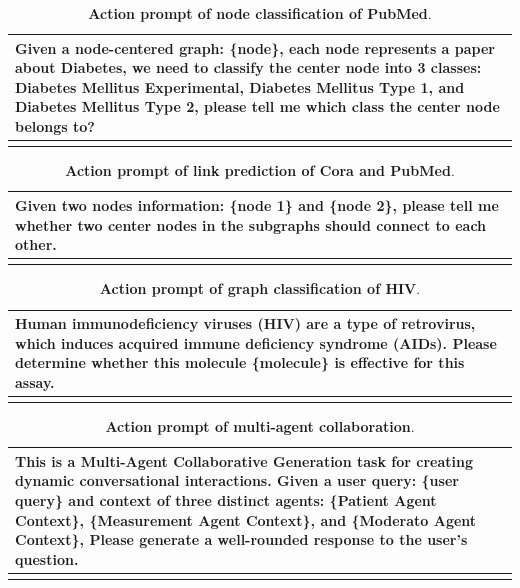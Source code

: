 \begin{table}[h]
\centering
\caption{\textbf{Action prompt of node classification of PubMed}.}
\begin{tabular}{p{13cm}}
\toprule[1.1pt]
    Given a node-centered graph: \{node\}, each node represents a paper about Diabetes, we need to classify the center node into 3 classes: Diabetes Mellitus Experimental, Diabetes Mellitus Type 1, and Diabetes Mellitus Type 2, please tell me which class the center node belongs to?\\
\bottomrule[1.1pt]
\label{prompt-template:PubMed_node}
\end{tabular}
\end{table}

\begin{table}[h]
\centering
\caption{\textbf{Action prompt of link prediction of  Cora and PubMed}.}
\begin{tabular}{p{13cm}}
\toprule[1.1pt]
    Given two nodes information: \{node 1\} and \{node 2\}, please tell me whether two center nodes in the subgraphs should connect to each other. \\
\bottomrule[1.1pt]
\label{prompt-template:link prediction}
\end{tabular}
\end{table}

\begin{table}[h]
\centering
\caption{\textbf{Action prompt of graph classification of  HIV}.}
\begin{tabular}{p{13cm}}
\toprule[1.1pt]
    Human immunodeficiency viruses (HIV) are a type of retrovirus, which induces acquired immune deficiency syndrome (AIDs). Please determine whether this molecule \{molecule\} is effective for this assay. \\
\bottomrule[1.1pt]
\label{prompt-template:HIV}
\end{tabular}
\end{table}



\begin{table}[h]
\centering
\caption{\textbf{Action prompt of multi-agent collaboration}.}
\begin{tabular}{p{13cm}}
\toprule[1.1pt]
    This is a Multi-Agent Collaborative Generation task for creating dynamic conversational interactions. Given a user query: \{user query\} and context of three distinct agents: \{Patient Agent Context\}, \{Measurement Agent Context\}, and \{Moderato Agent Context\}, Please generate a well-rounded response to the user's question.\\
\bottomrule[1.1pt]
\label{prompt-template:multi-agent collaboration}
\end{tabular}
\end{table}

